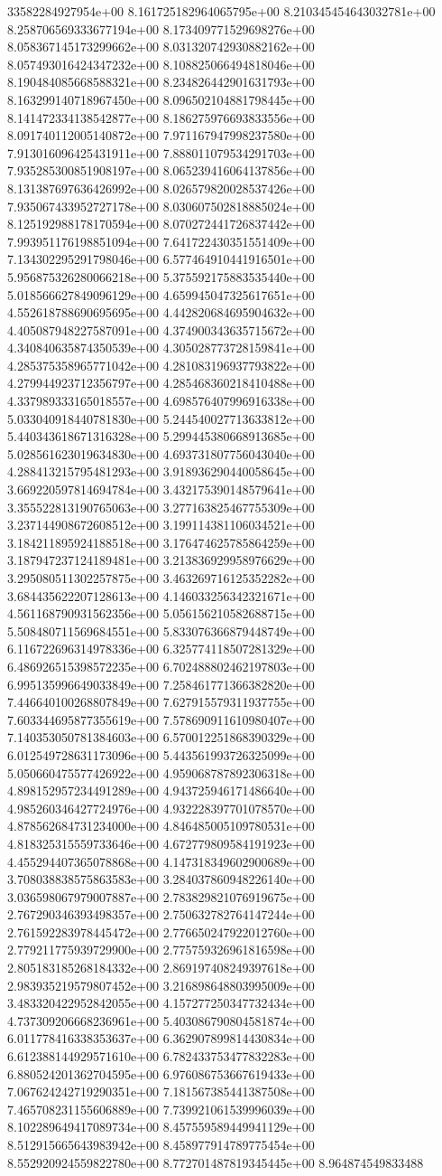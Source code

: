 33582284927954e+00	8.161725182964065795e+00	8.210345454643032781e+00	8.258706569333677194e+00	8.173409771529698276e+00	8.058367145173299662e+00	8.031320742930882162e+00	8.057493016424347232e+00	8.108825066494818046e+00	8.190484085668588321e+00	8.234826442901631793e+00	8.163299140718967450e+00	8.096502104881798445e+00	8.141472334138542877e+00	8.186275976693833556e+00	8.091740112005140872e+00	7.971167947998237580e+00	7.913016096425431911e+00	7.888011079534291703e+00	7.935285300851908197e+00	8.065239416064137856e+00	8.131387697636426992e+00	8.026579820028537426e+00	7.935067433952727178e+00	8.030607502818885024e+00	8.125192988178170594e+00	8.070272441726837442e+00	7.993951176198851094e+00	7.641722430351551409e+00	7.134302295291798046e+00	6.577464910441916501e+00	5.956875326280066218e+00	5.375592175883535440e+00	5.018566627849096129e+00	4.659945047325617651e+00	4.552618788690695695e+00	4.442820684695904632e+00	4.405087948227587091e+00	4.374900343635715672e+00	4.340840635874350539e+00	4.305028773728159841e+00	4.285375358965771042e+00	4.281083196937793822e+00	4.279944923712356797e+00	4.285468360218410488e+00	4.337989333165018557e+00	4.698576407996916338e+00	5.033040918440781830e+00	5.244540027713633812e+00	5.440343618671316328e+00	5.299445380668913685e+00	5.028561623019634830e+00	4.693731807756043040e+00	4.288413215795481293e+00	3.918936290440058645e+00	3.669220597814694784e+00	3.432175390148579641e+00	3.355522813190765063e+00	3.277163825467755309e+00	3.237144908672608512e+00	3.199114381106034521e+00	3.184211895924188518e+00	3.176474625785864259e+00	3.187947237124189481e+00	3.213836929958976629e+00	3.295080511302257875e+00	3.463269716125352282e+00	3.684435622207128613e+00	4.146033256342321671e+00	4.561168790931562356e+00	5.056156210582688715e+00	5.508480711569684551e+00	5.833076366879448749e+00	6.116722696314978336e+00	6.325774118507281329e+00	6.486926515398572235e+00	6.702488802462197803e+00	6.995135996649033849e+00	7.258461771366382820e+00	7.446640100268807849e+00	7.627915579311937755e+00	7.603344695877355619e+00	7.578690911610980407e+00	7.140353050781384603e+00	6.570012251868390329e+00	6.012549728631173096e+00	5.443561993726325099e+00	5.050660475577426922e+00	4.959068787892306318e+00	4.898152957234491289e+00	4.943725946171486640e+00	4.985260346427724976e+00	4.932228397701078570e+00	4.878562684731234000e+00	4.846485005109780531e+00	4.818325315559733646e+00	4.672779809584191923e+00	4.455294407365078868e+00	4.147318349602900689e+00	3.708038838575863583e+00	3.284037860948226140e+00	3.036598067979007887e+00	2.783829821076919675e+00	2.767290346393498357e+00	2.750632782764147244e+00	2.761592283978445472e+00	2.776650247922012760e+00	2.779211775939729900e+00	2.775759326961816598e+00	2.805183185268184332e+00	2.869197408249397618e+00	2.983935219579807452e+00	3.216898648803995009e+00	3.483320422952842055e+00	4.157277250347732434e+00	4.737309206668236961e+00	5.403086790804581874e+00	6.011778416338353637e+00	6.362907899814430834e+00	6.612388144929571610e+00	6.782433753477832283e+00	6.880524201362704595e+00	6.976086753667619433e+00	7.067624242719290351e+00	7.181567385441387508e+00	7.465708231155606889e+00	7.739921061539996039e+00	8.102289649417089734e+00	8.457559589449941129e+00	8.512915665643983942e+00	8.458977914789775454e+00	8.552920924559822780e+00	8.772701487819345445e+00	8.964874549833488